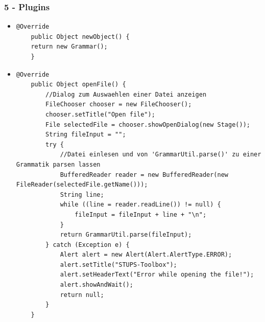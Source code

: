\documentclass[9pt, xcolor={dvipsnames}]{beamer}
\begin{document}
\begin{frame}[fragile]\frametitle{5 - Plugins}
	\begin{itemize}
		\item[]
		\begin{lstlisting}[frame=single, basicstyle=\tiny]
	@Override
	public Object newObject() {
	return new Grammar();
	}
		\end{lstlisting}
		\pause
		\item[]
		\begin{lstlisting}[frame=single, basicstyle=\tiny]
	@Override
	public Object openFile() {
		//Dialog zum Auswaehlen einer Datei anzeigen
		FileChooser chooser = new FileChooser();
		chooser.setTitle("Open file");
		File selectedFile = chooser.showOpenDialog(new Stage());
		String fileInput = "";
		try {
			//Datei einlesen und von 'GrammarUtil.parse()' zu einer Grammatik parsen lassen
			BufferedReader reader = new BufferedReader(new FileReader(selectedFile.getName()));
			String line;
			while ((line = reader.readLine()) != null) {
				fileInput = fileInput + line + "\n";
			}
			return GrammarUtil.parse(fileInput);
		} catch (Exception e) {
			Alert alert = new Alert(Alert.AlertType.ERROR);
			alert.setTitle("STUPS-Toolbox");
			alert.setHeaderText("Error while opening the file!");
			alert.showAndWait();
			return null;
		}
	}
		\end{lstlisting}
	\end{itemize}
\end{frame}
\end{document}
